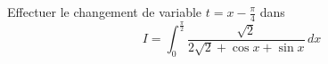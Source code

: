 Effectuer le changement de variable $t= x - \frac{\pi}{4}$ dans
\begin{displaymath}
 I=\int_{0}^{\frac{\pi}{2}}\frac{\sqrt{2}}{2\sqrt{2} + \cos x + \sin x}\,dx
\end{displaymath}
\bigskip \bigskip